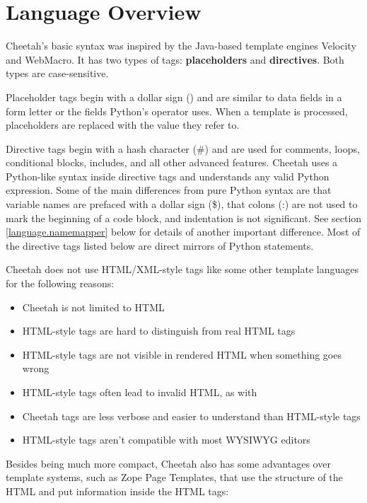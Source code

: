 \section{Language Overview}
\label{language}


Cheetah's basic syntax was inspired by the Java-based template engines Velocity
and WebMacro. It has two types of tags: {\bf placeholders} and {\bf directives}.
Both types are case-sensitive.  

Placeholder tags begin with a dollar sign () and are similar to
data fields in a form letter or the  fields Python's \code{\%}
operator uses. When a template is processed, placeholders are replaced with the
value they refer to.

Directive tags begin with a hash character (\#) and are used for comments, loops,
conditional blocks, includes, and all other advanced features. Cheetah uses a
Python-like syntax inside directive tags and understands any valid Python
expression.  Some of the main differences from pure Python syntax are that
variable names are prefaced with a dollar sign (\$), that colons (:) are not
used to mark the beginning of a code block, and indentation is not significant.
See section \ref{language.namemapper} below for details of another important
difference. Most of the directive tags listed below are direct mirrors of Python
statements.

Cheetah does not use HTML/XML-style tags like some other template languages for
the following reasons:
\begin{itemize}
\item Cheetah is not limited to HTML
\item HTML-style tags are hard to distinguish from real HTML tags
\item HTML-style tags are not visible in rendered HTML when something goes wrong
\item HTML-style tags often lead to invalid HTML, as with
\item Cheetah tags are less verbose and easier to understand than
     HTML-style tags
\item HTML-style tags aren't compatible with most WYSIWYG editors
\end{itemize}

Besides being much more compact, Cheetah also has some advantages over template
systems, such as Zope Page Templates, that use the structure of the HTML and put
information inside the HTML tags:

